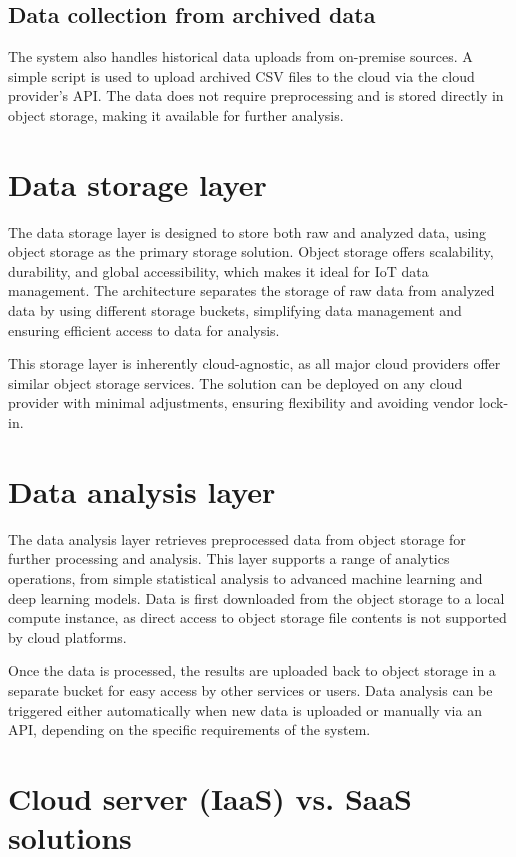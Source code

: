 \subsection{Data collection from archived data}
The system also handles historical data uploads from on-premise sources. A simple script is used to upload archived CSV files to the cloud via the cloud provider's API. The data does not require preprocessing and is stored directly in object storage, making it available for further analysis.

\section{Data storage layer}

The data storage layer is designed to store both raw and analyzed data, using object storage as the primary storage solution. Object storage offers scalability, durability, and global accessibility, which makes it ideal for IoT data management. The architecture separates the storage of raw data from analyzed data by using different storage buckets, simplifying data management and ensuring efficient access to data for analysis.

This storage layer is inherently cloud-agnostic, as all major cloud providers offer similar object storage services. The solution can be deployed on any cloud provider with minimal adjustments, ensuring flexibility and avoiding vendor lock-in.

\section{Data analysis layer}

The data analysis layer retrieves preprocessed data from object storage for further processing and analysis. This layer supports a range of analytics operations, from simple statistical analysis to advanced machine learning and deep learning models. Data is first downloaded from the object storage to a local compute instance, as direct access to object storage file contents is not supported by cloud platforms.

Once the data is processed, the results are uploaded back to object storage in a separate bucket for easy access by other services or users. Data analysis can be triggered either automatically when new data is uploaded or manually via an API, depending on the specific requirements of the system.

\section{Cloud server (IaaS) vs. SaaS solutions}

